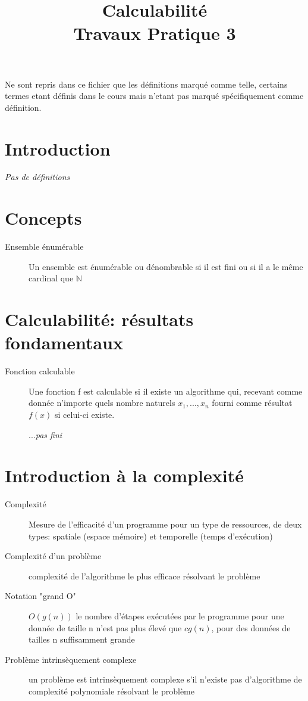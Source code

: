 \documentclass[a4paper,onecolumn,11pt]{article}
\author{}
\title{Calculabilité\\Travaux Pratique 3}
\date{}
\begin{document}
\maketitle

Ne sont repris dans ce fichier que les définitions marqué comme telle, certains termes etant définis dans le cours mais n'etant pas marqué spécifiquement comme définition.

\section{Introduction}
\textit{Pas de définitions}
\section{Concepts}
\begin{description}
	\item[Ensemble énumérable] Un ensemble est énumérable ou dénombrable si il est fini ou si il a le même cardinal que $\mathbb{N}$
\end{description}
\section{Calculabilité: résultats fondamentaux}
\begin{description}
	\item[Fonction calculable] Une fonction f est calculable si il existe un algorithme qui, recevant comme donnée n'importe quels nombre naturels $x_1, ..., x_n$ fourni comme résultat $f(x)$ si celui-ci existe.
	\item[]...\textit{pas fini}
\end{description}
\section{}
\section{}
\section{Introduction à la complexité}
\begin{description}
    \item[Complexité] Mesure de l'efficacité d'un programme pour un type de ressources, de deux types: spatiale (espace mémoire) et temporelle (temps d'exécution)
	\item[Complexité d'un problème] complexité de l'algorithme le plus efficace résolvant le problème
	\item[Notation "grand O"] $O(g(n))$ le nombre d'étapes exécutées par le programme pour une donnée de taille n n'est pas plus élevé que $cg(n)$, pour des données de tailles n suffisamment grande 
	\item[Problème intrinsèquement complexe] un problème est intrinsèquement complexe s'il n'existe pas d'algorithme de complexité polynomiale résolvant le problème
\end{description}
\end{document}
